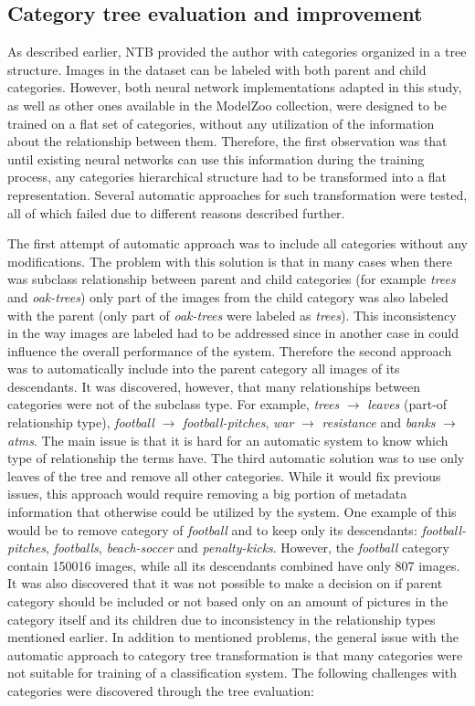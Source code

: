 \subsection{Category tree evaluation and improvement}
    \label{sec:tree-eval}
    As described earlier, NTB provided the author with categories organized in a tree structure. Images in the dataset can be labeled with both parent and child categories. However, both neural network implementations adapted in this study, as well as other ones available in the ModelZoo \cite{CaffeModelZoo} collection, were designed to be trained on a flat set of categories, without any utilization of the information about the relationship between them. Therefore, the first observation was that until existing neural networks can use this information during the training process, any categories hierarchical structure had to be transformed into a flat representation. Several automatic approaches for such transformation were tested, all of which failed due to different reasons described further.
    
    The first attempt of automatic approach was to include all categories without any modifications. The problem with this solution is that in many cases when there was subclass relationship between parent and child categories (for example \textit{trees} and \textit{oak-trees}) only part of the images from the child category was also labeled with the parent (only part of \textit{oak-trees} were labeled as \textit{trees}). This inconsistency in the way images are labeled had to be addressed since in another case in could influence the overall performance of the system. Therefore the second approach was to automatically include into the parent category all images of its descendants. It was discovered, however, that many relationships between categories were not of the subclass type. For example, \textit{trees} $\rightarrow$ \textit{leaves} (part-of relationship type), \textit{football} $\rightarrow$ \textit{football-pitches}, \textit{war} $\rightarrow$ \textit{resistance} and \textit{banks} $\rightarrow$ \textit{atms}. The main issue is that it is hard for an automatic system to know which type of relationship the terms have. The third automatic solution was to use only leaves of the tree and remove all other categories. While it would fix previous issues, this approach would require removing a big portion of metadata information that otherwise could be utilized by the system. One example of this would be to remove category of \textit{football} and to keep only its descendants: \textit{football-pitches}, \textit{footballs}, \textit{beach-soccer} and \textit{penalty-kicks}. However, the \textit{football} category contain 150016 images, while all its descendants combined have only 807 images. It was also discovered that it was not possible to make a decision on if parent category should be included or not based only on an amount of pictures in the category itself and its children due to inconsistency in the relationship types mentioned earlier. In addition to mentioned problems, the general issue with the automatic approach to category tree transformation is that many categories were not suitable for training of a classification system. The following challenges with categories were discovered through the tree evaluation:
    
